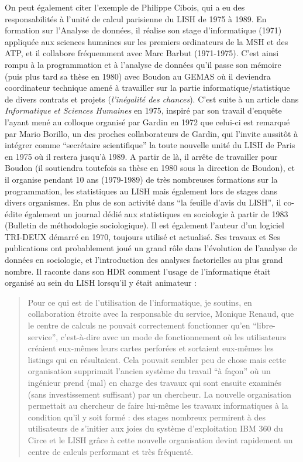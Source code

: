 On peut également citer l'exemple de Philippe Cibois, qui a eu des responsabilités à l'unité de calcul parisienne du LISH de 1975 à 1989. En formation sur l’Analyse de données, il réalise son stage d’informatique (1971) appliquée aux sciences humaines sur les premiers ordinateurs de la MSH et des ATP, et il collabore fréquemment avec Marc Barbut (1971-1975). C’est ainsi rompu à la programmation et à l’analyse de données qu’il passe son mémoire (puis plus tard sa thèse en 1980) avec Boudon au GEMAS où il deviendra coordinateur technique amené à travailler sur la partie informatique/statistique de divers contrats et projets (\textit{l’inégalité des chances}). C’est suite à un article dans \textit{Informatique et Sciences Humaines} en 1975, inspiré par son travail d’enquête l’ayant mené au colloque  organisé par Gardin en 1972 que celui-ci est remarqué par Mario Borillo, un des proches collaborateurs de Gardin, qui l’invite aussitôt à intégrer comme \enquote{secrétaire scientifique} la toute nouvelle unité du LISH de Paris en 1975 où il restera jusqu’à 1989. A partir de là, il arrête de travailler pour Boudon (il soutiendra toutefois sa thèse en 1980 sous la direction de Boudon), et il organise pendant 10 ans (1979-1989) de très nombreuses formations sur la programmation, les statistiques au LISH mais également lors de stages dans divers organismes. En plus de son activité dans \enquote{la feuille d’avis du LISH}, il co-édite également un journal dédié aux statistiques en sociologie à partir de 1983 (Bulletin de méthodologie sociologique). Il est également l’auteur d’un logiciel TRI-DEUX démarré en 1970, toujours utilisé et actualisé. Ses travaux et Ses publications ont probablement joué un grand rôle dans l’évolution de l’analyse de données en sociologie, et l’introduction des analyses factorielles au plus grand nombre. Il raconte dans son HDR comment l’usage de l’informatique était organisé au sein du LISH lorsqu’il y était animateur :

\blockquote[{\cite[21]{Cibois1993}}]{Pour ce qui est de l'utilisation de l'informatique, je soutins, en collaboration étroite avec la responsable du service, Monique Renaud, que le centre de calculs ne pouvait correctement fonctionner qu'en \enquote{libre-service}, c'est-à-dire avec un mode de fonctionnement où les utilisateurs créaient eux-mêmes leurs cartes perforées et sortaient eux-mêmes les listings qui en résultaient. Cela pouvait sembler peu de chose mais cette organisation supprimait l'ancien système du travail \enquote{à  façon} où un ingénieur  prend (mal) en charge des travaux  qui sont ensuite examinés (sans investissement suffisant) par un chercheur. La nouvelle organisation permettait au chercheur de faire lui-même les travaux informatiques à la condition qu'il y soit formé : des stages nombreux permirent à des utilisateurs de s'initier aux joies du système d'exploitation IBM 360 du Circe et le LISH grâce à cette nouvelle organisation devint rapidement un centre de calculs performant et très fréquenté.}

